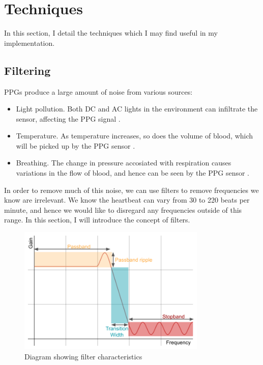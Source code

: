 \documentclass[12pt,a4paper,twoside,openany]{report}
\begin{document}
\section{Techniques}

In this section, I detail the techniques which I may find useful in my
implementation.

\subsection{Filtering} \label{sec:intro-filters}

PPGs produce a large amount of noise from various sources:
\begin{itemize}
	\item Light pollution. Both DC and AC lights in the environment can
		infiltrate the sensor, affecting the PPG signal \cite{kim15}.
	\item Temperature. As temperature increases, so does the volume of
		blood, which will be picked up by the PPG sensor 
		\cite{shin16}.
	\item Breathing. The change in pressure accosiated with respiration
		causes variations in the flow of blood, and hence can be seen
		by the PPG sensor \cite{allen02}.
\end{itemize}

In order to remove much of this noise, we can use filters to remove
frequencies we know are irrelevant. We know the heartbeat can vary from 
30 to 220 beats per minute, and hence we would like to disregard any
frequencies 
outside of this range. In this section, I will introduce the concept of 
filters.

\begin{figure}[h!]
	\centerline{\includegraphics[width=0.8\textwidth]{figs/filter.png}}
\caption{Diagram showing filter characteristics}
\label{fig:filterdiag}
\end{figure}
\end{document}
